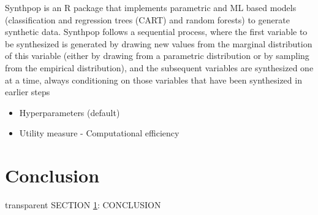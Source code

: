 \documentclass[t,8pt,utfx8]{beamer}
\begin{document}
\begin{spacing}{1.25}
\begin{frame}[c,plain]
Synthpop is an R package that implements parametric and ML based models (classification and regression trees (CART) and random forests) to generate synthetic data. Synthpop follows a sequential process, where the first variable to be synthesized is generated by drawing new values from the marginal distribution of this variable (either by drawing from a parametric distribution or by sampling from the empirical distribution), and the subsequent variables are synthesized one at a time, always conditioning on those variables that have been synthesized in earlier steps

\begin{itemize}
    \item Hyperparameters (default)
    \item Utility measure - Computational efficiency
\end{itemize}

\end{frame}


\section{Conclusion}\label{sec:conclusion}
\begin{frame}[c,plain]
\vskip-4mm
\begin{beamercolorbox}[wd=\boxwidth,ht=22.11mm]{transparent}%
    \vfill%
    \leftinsert%
    \MakeUppercase{Section \ref{sec:conclusion}: Conclusion} %
\end{beamercolorbox}
\vskip-3mm

\end{frame}


\end{spacing}
\end{document}

